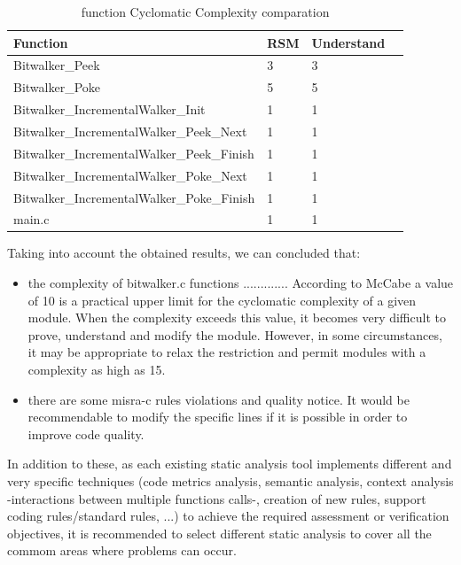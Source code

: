 \begin{longtable}{||p{}|p{}|p{}|p{}||}
  \caption{function Cyclomatic Complexity comparation}\\
    \hline\hline
    \textbf{Function} &\textbf{RSM} & \textbf{Understand} \\
    \hline\hline
    \endhead
    \hline\hline
    \endfoot
    Bitwalker\_Peek & 3 & 3 
    \\
    \hline
    Bitwalker\_Poke & 5 & 5 
    \\
    \hline
    Bitwalker\_IncrementalWalker\_Init & 1 & 1 
    \\
    \hline
    Bitwalker\_IncrementalWalker\_Peek\_Next & 1 & 1 
    \\
    \hline
    Bitwalker\_IncrementalWalker\_Peek\_Finish & 1 & 1 
    \\
    \hline
    Bitwalker\_IncrementalWalker\_Poke\_Next & 1 & 1 
    \\
    \hline
    Bitwalker\_IncrementalWalker\_Poke\_Finish & 1 & 1 
    \\
    \hline
    main.c & 1 & 1 
    \\
    \hline
\end{longtable}

Taking into account the obtained results, we can concluded that:
\begin{itemize}
\item the complexity of bitwalker.c functions ............. According to McCabe a value of 10 is a practical upper limit for the cyclomatic complexity of a given module. When the complexity exceeds this value, it becomes very difficult to prove, understand and modify the module. However, in some circumstances, it may be appropriate to relax the restriction and permit modules with a complexity as high as 15.
\item there are some misra-c rules violations and quality notice. It would be recommendable to modify the specific lines if it is possible in order to improve code quality.
\end{itemize}

In addition to these, as each existing static analysis tool implements different and very specific techniques (code metrics analysis, semantic analysis, context analysis -interactions between multiple functions calls-, creation of new rules, support coding rules/standard rules, ...) to achieve the required assessment or verification objectives, it is recommended to select different static analysis to cover all the commom areas where problems can occur.
